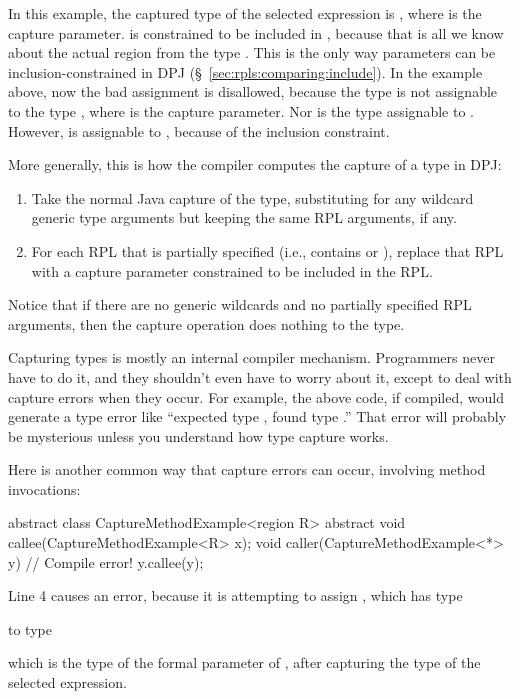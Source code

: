 In this example, the captured type of the selected expression is
, where  is the capture parameter.
 is constrained to be included in , because that is
all we know about the actual region from the type
.  This is the only way parameters can be
inclusion-constrained in DPJ (\S~\ref{sec:rpls:comparing:include}).
In the example above, now the bad assignment is disallowed, because
the type  is not assignable to the type
, where  is the capture parameter.  Nor
is the type  assignable to
.  However,  is
assignable to , because of the inclusion
constraint.

More generally, this is how the compiler computes the capture of a type
in DPJ:
%
\begin{enumerate}
\item Take the normal Java capture of the type, substituting for any
  wildcard generic type arguments but keeping the same RPL
  arguments, if any.
\item For each RPL that is partially specified (i.e., contains \kwd{*}
  or \kwd{[?]}), replace that RPL with a capture parameter constrained
  to be included in the RPL.
\end{enumerate}
%
Notice that if there are no generic wildcards and no partially
specified RPL arguments, then the capture operation does nothing to
the type.

Capturing types is mostly an internal compiler mechanism.  Programmers
never have to do it, and they shouldn't even have to worry about it,
except to deal with capture errors when they occur.  For example, the
above code, if compiled, would generate a type error like ``expected
type , found type
.''  That error will probably be mysterious
unless you understand how type capture works.

Here is another common way that capture errors can occur, involving
method invocations:
%
\begin{numbereddpjlisting}
abstract class CaptureMethodExample<region R> {
    abstract void callee(CaptureMethodExample<R> x);
    void caller(CaptureMethodExample<*> y) {
        // Compile error!
        y.callee(y);
    }
}
\end{numbereddpjlisting}
%
Line 4 causes an error, because it is attempting to assign ,
which has type 
%
\begin{description}
\item {} 
\end{description}
%
to type 
%
\begin{description}
\item {}
\end{description}
%
which is the type of the formal parameter  of ,
after capturing the type of the selected expression.

